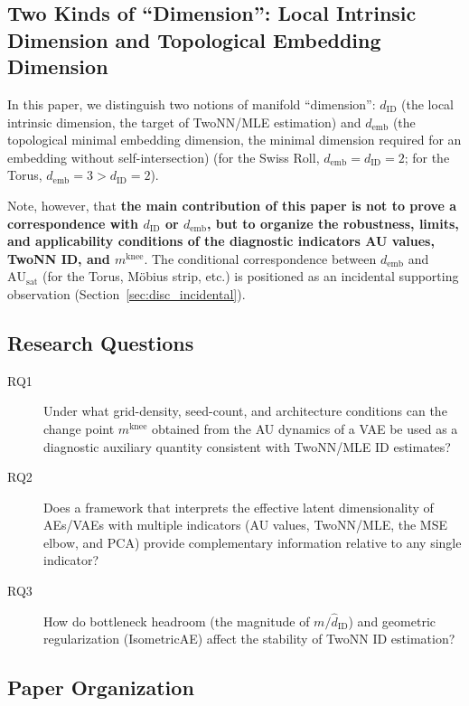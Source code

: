\documentclass[make,article,submit,pdftex,moreauthors]{Definitions/mdpi}
\newcommand{\dID}{d_{\mathrm{ID}}}
\newcommand{\AUsat}{\mathrm{AU}_{\mathrm{sat}}}
\newcommand{\mknee}{m^{\mathrm{knee}}}
\newcommand{\demb}{d_{\mathrm{emb}}}
\begin{document}
\subsection{Two Kinds of ``Dimension'': Local Intrinsic Dimension and Topological Embedding Dimension}\label{sec:intro_dim}

In this paper, we distinguish two notions of manifold ``dimension'':
$\dID$ (the local intrinsic dimension, the target of TwoNN/MLE estimation) and
$\demb$ (the topological minimal embedding dimension, the minimal dimension
required for an embedding without self-intersection)
(for the Swiss Roll, $\demb = \dID = 2$; for the Torus, $\demb = 3 > \dID = 2$).

Note, however, that \textbf{the main contribution of this paper is not to prove a
correspondence with $\dID$ or $\demb$, but to organize the robustness, limits,
and applicability conditions of the diagnostic indicators AU values, TwoNN ID,
and $\mknee$}.
The conditional correspondence between $\demb$ and $\AUsat$ (for the Torus,
M\"obius strip, etc.) is positioned as an incidental supporting observation
(Section~\ref{sec:disc_incidental}).

\subsection{Research Questions}\label{sec:intro_rq}

\begin{description}
  \item[RQ1] Under what grid-density, seed-count, and architecture conditions can
             the change point $\mknee$ obtained from the AU dynamics of a VAE be
             used as a diagnostic auxiliary quantity consistent with TwoNN/MLE
             ID estimates?
  \item[RQ2] Does a framework that interprets the effective latent dimensionality
             of AEs/VAEs with multiple indicators (AU values, TwoNN/MLE, the MSE
             elbow, and PCA) provide complementary information relative to any
             single indicator?
  \item[RQ3] How do bottleneck headroom (the magnitude of $m / \hat{d}_\mathrm{ID}$)
             and geometric regularization (IsometricAE) affect the stability of
             TwoNN ID estimation?
\end{description}

\subsection{Paper Organization}\label{sec:intro_structure}
\end{document}
